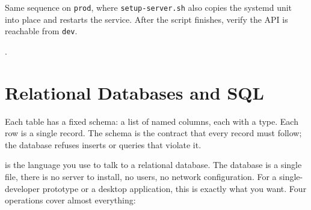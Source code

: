 Same sequence on \texttt{prod}, where \texttt{setup-server.sh} also
copies the systemd unit into place and restarts the service. After the
script finishes, verify the API is reachable from \texttt{dev}.




.




\newpage
\section{Relational Databases and SQL}

Each table has a fixed schema: a list of named columns, each with a type.
Each row is a single record.
The schema is the contract that every record must follow; the database refuses
inserts or queries that violate it.


 is the language you use to talk to a relational database.
The database is a single file, there is no server to install, no users,
no network configuration. For a single-developer prototype or a desktop
application, this is exactly what you want.
Four operations cover almost everything:


